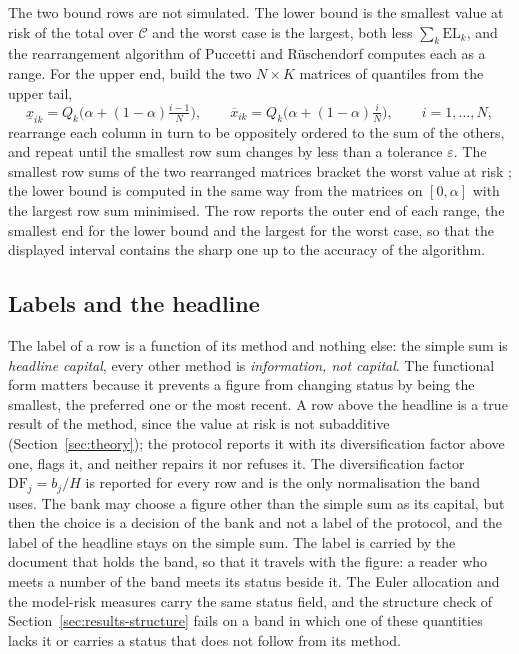 The two bound rows are not simulated. The lower bound is the smallest value at risk of the total over $\mathcal C$ and the worst
case is the largest, both less $\sum_k\mathrm{EL}_k$, and the rearrangement algorithm of Puccetti and R\"uschendorf
\citep{puccetti2012} computes each as a range. For the upper end, build the two $N\times K$ matrices of quantiles from the upper
tail,
\begin{equation}
\underline x_{ik}=Q_k\!\Big(\alpha+(1-\alpha)\tfrac{i-1}{N}\Big),\qquad
\overline x_{ik}=Q_k\!\Big(\alpha+(1-\alpha)\tfrac{i}{N}\Big),\qquad i=1,\dots,N ,
\label{eq:rearrangement-matrix}
\end{equation}
rearrange each column in turn to be oppositely ordered to the sum of the others, and repeat until the smallest row sum changes
by less than a tolerance $\varepsilon$. The smallest row sums of the two rearranged matrices bracket the worst value at risk
\citep{epr2013}; the lower bound is computed in the same way from the matrices on $[0,\alpha]$ with the largest row sum
minimised. The row reports the outer end of each range, the smallest end for the lower bound and the largest for the worst case,
so that the displayed interval contains the sharp one up to the accuracy of the algorithm.

\subsection{Labels and the headline}
\label{sec:method-labels}

The label of a row is a function of its method and nothing else: the simple sum is \emph{headline capital}, every other method is
\emph{information, not capital}. The functional form matters because it prevents a figure from changing status by being the
smallest, the preferred one or the most recent. A row above the headline is a true result of the method, since the value at risk
is not subadditive (Section~\ref{sec:theory}); the protocol reports it with its diversification factor above one, flags it, and
neither repairs it nor refuses it. The diversification factor $\mathrm{DF}_j=b_j/H$ is reported for every row and is the only
normalisation the band uses. The bank may choose a figure other than the simple sum as its capital, but then the choice is a
decision of the bank and not a label of the protocol, and the label of the headline stays on the simple sum. The label is carried by the document that holds the band, so that it
travels with the figure: a reader who meets a number of the band meets its status beside it. The Euler allocation and the
model-risk measures carry the same status field, and the structure check of Section~\ref{sec:results-structure} fails on a band in which one of these quantities lacks it or
carries a status that does not follow from its method.

